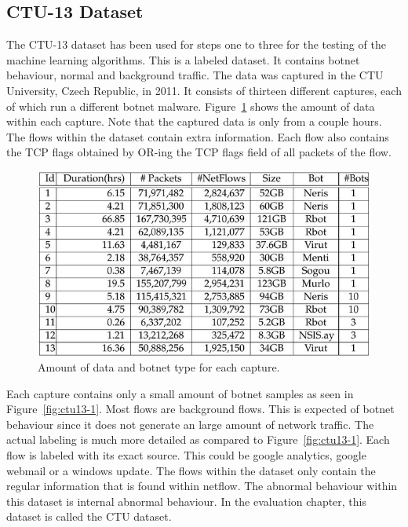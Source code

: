 \subsection{CTU-13 Dataset}
The CTU-13 dataset has been used for steps one to three for the testing of the machine learning algorithms. This is a labeled dataset. It contains botnet behaviour, normal and background traffic. The data was captured in the CTU University, Czech Republic, in 2011. It consists of thirteen different captures, each of which run a different botnet malware. Figure~\ref{fig:ctu13-2} shows the amount of data within each capture. Note that the captured data is only from a couple hours. The flows within the dataset contain extra information. Each flow also contains the TCP flags obtained by OR-ing the TCP flags field of all packets of the flow. \cite{garcia2014empirical} 

 \begin{figure}[H]
\centering
\includegraphics[width=1\textwidth]{Figures/ctu13-2}
\decoRule
\caption[Amount of data and botnet type for each capture]{Amount of data and botnet type for each capture. \cite{garcia2014empirical}}
\label{fig:ctu13-2}
\end{figure}

\noindent Each capture contains only a small amount of botnet samples as seen in Figure~\ref{fig:ctu13-1}.  Most flows are background flows. This is expected of botnet behaviour since it does not generate an large amount of network traffic. The actual labeling is much more detailed as compared to Figure~\ref{fig:ctu13-1}. Each flow is labeled with its exact source. This could be google analytics, google webmail or a windows update. The flows within the dataset only contain the regular information that is found within netflow. The abnormal behaviour within this dataset is internal abnormal behaviour. In the evaluation chapter, this dataset is called the CTU dataset.

